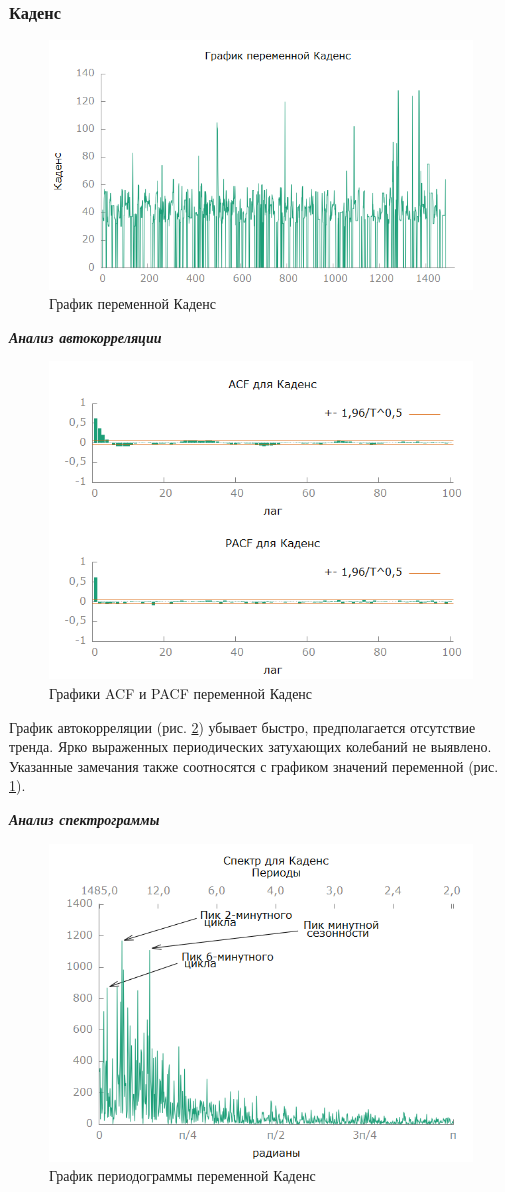 \documentclass[a4paper,12pt]{article}
\begin{document}
\subsubsection{Каденс}
\begin{figure}[H]
	\centering
	\includegraphics[width=0.5\linewidth]{../[graphics]/cad_graph}
	\caption{График переменной Каденс}
	\label{fig:cad_graph}
\end{figure}

\textbf{\textit{Анализ автокорреляции}}

\begin{figure}[H]
	\centering
	\includegraphics[width=0.5\linewidth]{../[graphics]/cad_acf_100}
	\caption{Графики ACF и PACF переменной Каденс}
	\label{fig:cad_acf_100}
\end{figure}

График автокорреляции (рис. \ref{fig:cad_acf_100}) убывает быстро, предполагается отсутствие тренда. Ярко выраженных периодических затухающих колебаний не выявлено. Указанные замечания также соотносятся с графиком значений переменной (рис. \ref{fig:cad_graph}).

\textbf{\textit{Анализ спектрограммы}}

\begin{figure}[H]
	\centering
	\includegraphics[width=0.5\linewidth]{../[graphics]/cad_spectr}
	\caption{График периодограммы переменной Каденс}
	\label{fig:cad_spectr}
\end{figure}
\end{document}
